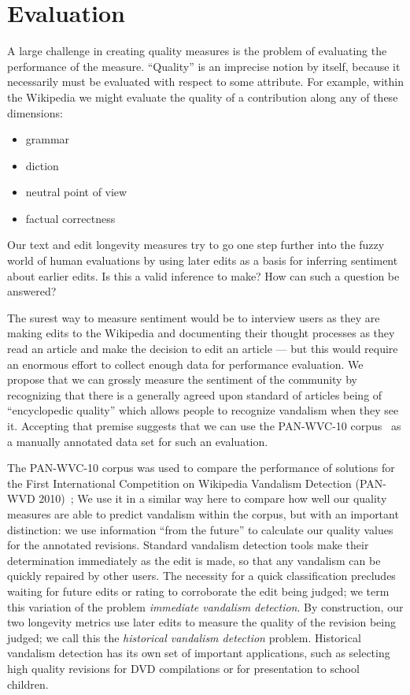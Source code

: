 \section{Evaluation}

A large challenge in creating quality measures is the
problem of evaluating the performance of the measure.
``Quality'' is an imprecise notion by itself, because it
necessarily must be evaluated with respect to some attribute.
For example, within the Wikipedia we might evaluate the quality
of a contribution along any of these dimensions:
\begin{itemize}
\item grammar
\item diction
\item neutral point of view
\item factual correctness
\end{itemize}
Our text and edit longevity measures try to go one step
further into the fuzzy world of human evaluations by using
later edits as a basis for inferring sentiment about earlier edits.
Is this a valid inference to make?
How can such a question be answered?

The surest way to measure sentiment would be to interview
users as they are making edits to the Wikipedia and documenting
their thought processes as they read an article and make the
decision to edit an article --- but this would require an enormous
effort to collect enough data for performance evaluation.
We propose that we can grossly measure the sentiment of the
community by recognizing that there is a generally agreed upon
standard of articles being of ``encyclopedic quality''
which allows people to recognize vandalism when they see it.
Accepting that premise suggests that we can use the PAN-WVC-10
corpus~\cite{Potthast2010a} as a manually annotated data set for
such an evaluation.

The PAN-WVC-10 corpus was used to compare the performance of
solutions for the First International Competition on Wikipedia
Vandalism Detection (PAN-WVD 2010)~\cite{Potthast2010b};
We use it in a similar way here to compare how well our quality
measures are able to predict vandalism within the corpus,
but with an important distinction:
we use information ``from the future'' to calculate our
quality values for the annotated revisions.
Standard vandalism detection tools make their determination
immediately as the edit is made, so that any vandalism can be
quickly repaired by other users.
The necessity for a quick classification precludes waiting
for future edits or rating to corroborate the edit being judged;
we term this variation of the problem \textit{immediate vandalism detection}.
By construction, our two longevity metrics use later edits to
measure the quality of the revision being judged; we call
this the \textit{historical vandalism detection} problem.
Historical vandalism detection has its own set of important
applications, such as selecting high quality revisions for
DVD compilations or for presentation to school children.

